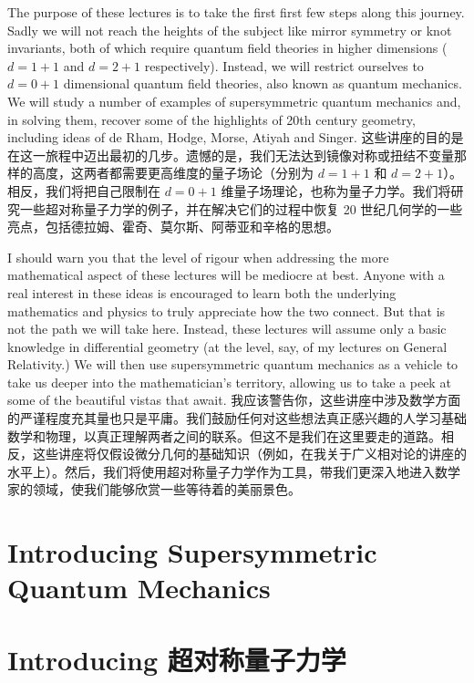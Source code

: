 \documentclass{article}
\begin{document}
\begin{paracol}{2}
The purpose of these lectures is to take the first first few steps along this journey. Sadly we will not reach the heights of the subject like mirror symmetry or knot invariants, both of which require quantum field theories in higher dimensions ($d = 1 + 1$ and $d = 2 + 1$ respectively). Instead, we will restrict ourselves to $d = 0 + 1$ dimensional quantum field theories, also known as quantum mechanics. We will study a number of examples of supersymmetric quantum mechanics and, in solving them, recover some of the highlights of 20th century geometry, including ideas of de Rham, Hodge, Morse, Atiyah and Singer.
\switchcolumn
这些讲座的目的是在这一旅程中迈出最初的几步。遗憾的是，我们无法达到镜像对称或扭结不变量那样的高度，这两者都需要更高维度的量子场论（分别为 $d = 1 + 1$ 和 $d = 2 + 1$）。相反，我们将把自己限制在 $d = 0 + 1$ 维量子场理论，也称为量子力学。我们将研究一些超对称量子力学的例子，并在解决它们的过程中恢复 20 世纪几何学的一些亮点，包括德拉姆、霍奇、莫尔斯、阿蒂亚和辛格的思想。
\switchcolumn*

I should warn you that the level of rigour when addressing the more mathematical aspect of these lectures will be mediocre at best. Anyone with a real interest in these ideas is encouraged to learn both the underlying mathematics and physics to truly appreciate how the two connect. But that is not the path we will take here. Instead, these lectures will assume only a basic knowledge in differential geometry (at the level, say, of my lectures on General Relativity.) We will then use supersymmetric quantum mechanics as a vehicle to take us deeper into the mathematician's territory, allowing us to take a peek at some of the beautiful vistas that await.
\switchcolumn
我应该警告你，这些讲座中涉及数学方面的严谨程度充其量也只是平庸。我们鼓励任何对这些想法真正感兴趣的人学习基础数学和物理，以真正理解两者之间的联系。但这不是我们在这里要走的道路。相反，这些讲座将仅假设微分几何的基础知识（例如，在我关于广义相对论的讲座的水平上）。然后，我们将使用超对称量子力学作为工具，带我们更深入地进入数学家的领域，使我们能够欣赏一些等待着的美丽景色。
\switchcolumn*

\section{Introducing Supersymmetric Quantum Mechanics}
\switchcolumn
\section*{Introducing 超对称量子力学}
\switchcolumn*


\end{paracol}
\end{document}
